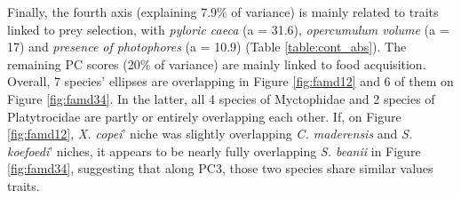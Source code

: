 Finally, the fourth axis (explaining 7.9\% of variance) is mainly related to traits linked to prey selection, with \emph{pyloric caeca} (a = 31.6), \emph{opercumulum volume} (a = 17) and \emph{presence of photophores} (a = 10.9) (Table \ref{table:cont_abs}). The remaining PC scores (20\% of variance) are mainly linked to food acquisition. 
Overall, 7 species' ellipses are overlapping in Figure \ref{fig:famd12} and 6 of them on Figure \ref{fig:famd34}. In the latter, all 4 species of Myctophidae and 2 species of Platytrocidae are partly or entirely overlapping each other. If, on Figure \ref{fig:famd12}, \textit{X. copei}' niche was slightly overlapping \textit{C. maderensis} and \textit{S. koefoedi}' niches, it appears to be nearly fully overlapping \textit{S. beanii} in Figure \ref{fig:famd34}, suggesting that along PC3, those two species share similar values traits.

